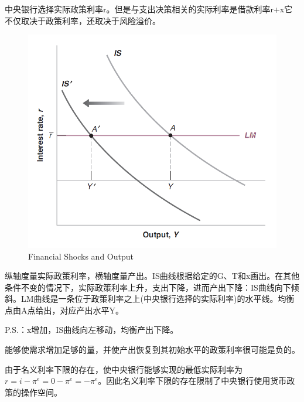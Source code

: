 \documentclass{article}
\begin{document}
中央银行选择实际政策利率r。但是与支出决策相关的实际利率是借款利率r+x它不仅取决于政策利率，还取决于风险溢价。

\begin{figure}[H] %
	\centering %
	\includegraphics[width=1\textwidth]{6_1} %
	\caption{Financial Shocks
		and Output} %
	\label{Fig.main2} %
\end{figure}

纵轴度量实际政策利率，横轴度量产出。IS曲线根据给定的G、T和x画出。在其他条件不变的情况下，实际政策利率上升，支出下降，进而产出下降：IS曲线向下倾斜。LM曲线是一条位于政策利率之上(中央银行选择的实际利率)的水平线。均衡点由A点给出，对应产出水平Y。

P.S.：x增加，IS曲线向左移动，均衡产出下降。

\hspace*{\fill}

能够使需求增加足够的量，并使产出恢复到其初始水平的政策利率很可能是负的。


由于名义利率下限的存在，使中央银行能够实现的最低实际利率为$ r=i-\pi^e=0-\pi^e=-\pi^e $。因此名义利率下限的存在限制了中央银行使用货币政策的操作空间。
\end{document}
